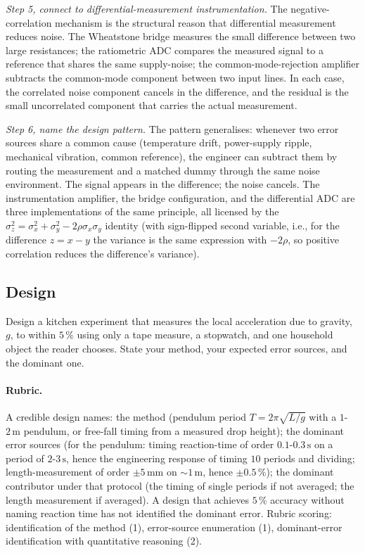\begin{exercise}
\textit{Step 5, connect to differential-measurement instrumentation.}
The negative-correlation mechanism is the structural reason that
differential measurement reduces noise. The Wheatstone bridge
measures the small difference between two large resistances; the
ratiometric ADC compares the measured signal to a reference that
shares the same supply-noise; the common-mode-rejection amplifier
subtracts the common-mode component between two input lines. In each
case, the correlated noise component cancels in the difference, and
the residual is the small uncorrelated component that carries the
actual measurement.

\textit{Step 6, name the design pattern.} The pattern generalises:
whenever two error sources share a common cause (temperature
drift, power-supply ripple, mechanical vibration, common reference),
the engineer can subtract them by routing the measurement and a
matched dummy through the same noise environment. The signal
appears in the difference; the noise cancels. The instrumentation
amplifier, the bridge configuration, and the differential ADC are
three implementations of the same principle, all licensed by the
$\sigma_{z}^{2} = \sigma_{x}^{2} + \sigma_{y}^{2} - 2\rho \sigma_{x}
\sigma_{y}$ identity (with sign-flipped second variable, i.e., for
the difference $z = x - y$ the variance is the same expression with
$-2\rho$, so positive correlation reduces the difference's variance).
\end{exercise}

\subsection*{Design}

\begin{exercise}
Design a kitchen experiment that measures the local acceleration due
to gravity, $g$, to within $5\,\%$ using only a tape measure, a
stopwatch, and one household object the reader chooses. State your
method, your expected error sources, and the dominant one.

\paragraph{Rubric.} A credible design names: the method (pendulum
period $T = 2\pi\sqrt{L/g}$ with a $1$-$2 \,\si{\meter}$ pendulum,
or free-fall timing from a measured drop height); the dominant
error sources (for the pendulum: timing reaction-time of order
$0.1$-$0.3 \,\si{\second}$ on a period of $2$-$3 \,\si{\second}$,
hence the engineering response of timing $10$ periods and dividing;
length-measurement of order $\pm 5 \,\si{\milli\meter}$ on
$\sim 1 \,\si{\meter}$, hence $\pm 0.5\,\%$); the dominant
contributor under that protocol (the timing of single periods if
not averaged; the length measurement if averaged). A design that
achieves $5\,\%$ accuracy without naming reaction time has not
identified the dominant error. Rubric scoring: identification of
the method (1), error-source enumeration (1), dominant-error
identification with quantitative reasoning (2).
\end{exercise}

